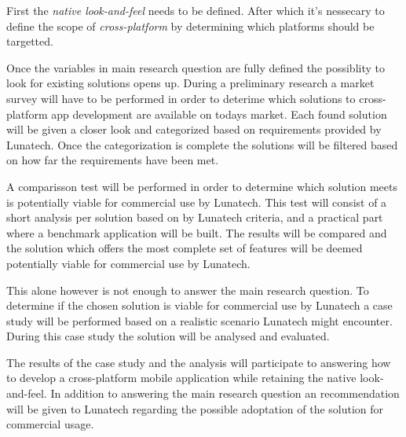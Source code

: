 

First the \emph{native look-and-feel} needs to be defined. After which it's nessecary to define the scope of \emph{cross-platform} by determining which platforms should be targetted.

Once the variables in main research question are fully defined the possiblity to look for existing solutions opens up. During a preliminary research a market survey will have to be performed in order to deterime which solutions to cross-platform app development are available on todays market. Each found solution will be given a closer look and categorized based on requirements provided by Lunatech. Once the categorization is complete the solutions will be filtered based on how far the requirements have been met.

A comparisson test will be performed in order to determine which solution meets is potentially viable for commercial use by Lunatech. This test will consist of a short analysis per solution based on by Lunatech criteria, and a practical part where a benchmark application will be built. The results will be compared and the solution which offers the most complete set of features will be deemed potentially viable for commercial use by Lunatech.

This alone however is not enough to answer the main research question. To determine if the chosen solution is viable for commercial use by Lunatech a case study will be performed based on a realistic scenario Lunatech might encounter. During this case study the solution will be analysed and evaluated.

The results of the case study and the analysis will participate to answering how to develop a cross-platform mobile application while retaining the native look-and-feel. In addition to answering the main research question an recommendation will be given to Lunatech regarding the possible adoptation of the solution for commercial usage.




